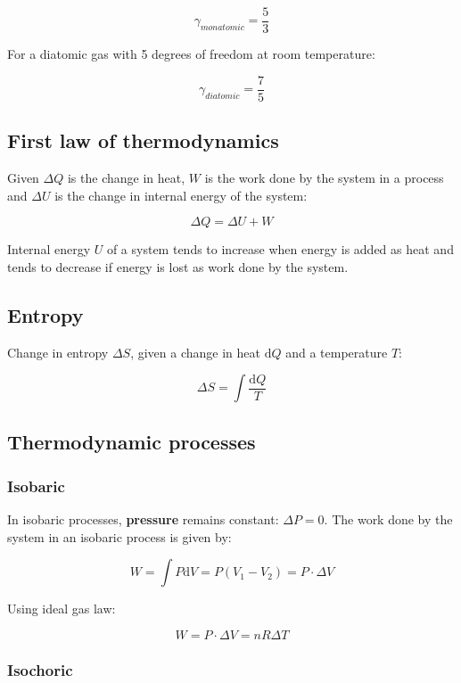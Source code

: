 \documentclass[12pt]{article}
\begin{document}
\[
\boxed{
\gamma_{monatomic} = \frac{5}{3}
}
\]

For a diatomic gas with 5 degrees of freedom at room temperature:

\[
\boxed{
\gamma_{diatomic} = \frac{7}{5}
}
\]

\subsection{First law of thermodynamics}

Given $\Delta Q$ is the change in heat, $W$ is the work done by the system in a process and $\Delta U$ is the change in internal energy of the system:

\[
\boxed{
\Delta Q = \Delta U + W
}
\]

Internal energy $U$ of a system tends to increase when energy is added as heat and tends to decrease if energy is lost as work done by the system.

\subsection{Entropy}

Change in entropy $\Delta S$, given a change in heat $\mathrm{d}Q$ and a temperature $T$:

\[
\boxed{
\Delta S = \int \frac{\mathrm{d}Q}{T}
}
\]

\newpage

\subsection{Thermodynamic processes}

\subsubsection{Isobaric}

In isobaric processes, \textbf{pressure} remains constant: $\Delta P = 0$. The work done by the system in an isobaric process is given by:

\[
\boxed{
W = \int P \mathrm{d}V = P(V_1 - V_2) = P\cdot \Delta V
}
\]

Using ideal gas law:

\[
\boxed{
W = P \cdot \Delta V = nR \Delta T
}
\]

\subsubsection{Isochoric}
\end{document}
